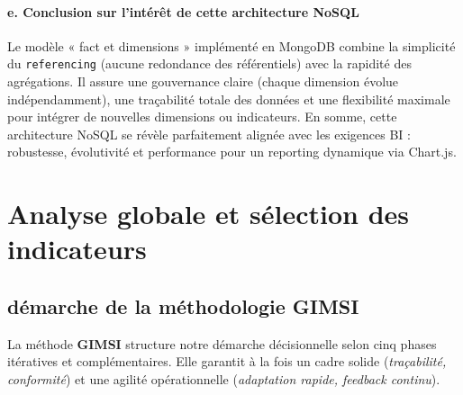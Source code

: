 \documentclass[a4paper,11pt]{report}
\begin{document}
\paragraph{e. Conclusion sur l’intérêt de cette architecture NoSQL\\}  
Le modèle « fact et dimensions » implémenté en MongoDB combine la simplicité du \texttt{referencing} (aucune redondance des référentiels) avec la rapidité des agrégations. Il assure une gouvernance claire (chaque dimension évolue indépendamment), une traçabilité totale des données et une flexibilité maximale pour intégrer de nouvelles dimensions ou indicateurs. En somme, cette architecture NoSQL se révèle parfaitement alignée avec les exigences BI : robustesse, évolutivité et performance pour un reporting dynamique via Chart.js.  





\section{Analyse globale et sélection des indicateurs}
\subsection{démarche de la méthodologie GIMSI}


La méthode \textbf{GIMSI} structure notre démarche décisionnelle selon cinq phases itératives et complémentaires.  
Elle garantit à la fois un cadre solide (\emph{traçabilité, conformité}) et une agilité opérationnelle (\emph{adaptation rapide, feedback continu}).  
\end{document}
